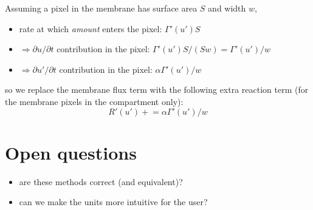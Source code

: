\documentclass{article}
\begin{document}
Assuming a pixel in the membrane has surface area $S$ and width $w$,
\begin{itemize}
    \item rate at which \emph{amount} enters the pixel: $\Gamma'(u') S$
    \item $\Rightarrow \partial u /\partial t$ contribution in the pixel: $\Gamma'(u') S / (S w) = \Gamma'(u') / w$
    \item $\Rightarrow \partial u' /\partial t$ contribution in the pixel: $\alpha \Gamma'(u') / w$
\end{itemize}
so we replace the membrane flux term with the following extra reaction term (for the membrane pixels in the compartment only):
\begin{equation}
    R'(u') \mathrel{+}= \alpha \Gamma'(u') / w
\end{equation}

\section{Open questions}

\begin{itemize}
    \item are these methods correct (and equivalent)?
    \item can we make the units more intuitive for the user?
\end{itemize}
\end{document}
